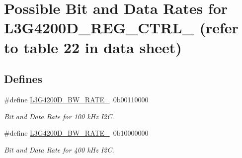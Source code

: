 \hypertarget{group___l3_g4200_d___b_w___r_a_t_e}{\section{\-Possible \-Bit and \-Data \-Rates for \-L3\-G4200\-D\-\_\-\-R\-E\-G\-\_\-\-C\-T\-R\-L\-\_ (refer to table 22 in data sheet)}
\label{group___l3_g4200_d___b_w___r_a_t_e}
}
\subsection*{\-Defines}
\begin{DoxyCompactItemize}
\item 
\hypertarget{group___l3_g4200_d___b_w___r_a_t_e_gaff099c109582a2b37649cf0f005c2f23}{\#define \hyperlink{group___l3_g4200_d___b_w___r_a_t_e_gaff099c109582a2b37649cf0f005c2f23}{\-L3\-G4200\-D\-\_\-\-B\-W\-\_\-\-R\-A\-T\-E\-\_}~0b00110000}\label{group___l3_g4200_d___b_w___r_a_t_e_gaff099c109582a2b37649cf0f005c2f23}

\begin{DoxyCompactList}\small\item\em \-Bit and \-Data \-Rate for 100 k\-Hz \-I2\-C. \end{DoxyCompactList}\item 
\hypertarget{group___l3_g4200_d___b_w___r_a_t_e_ga5a4ce71b8a706461d3fbd06e2fc1fe7d}{\#define \hyperlink{group___l3_g4200_d___b_w___r_a_t_e_ga5a4ce71b8a706461d3fbd06e2fc1fe7d}{\-L3\-G4200\-D\-\_\-\-B\-W\-\_\-\-R\-A\-T\-E\-\_}~0b10000000}\label{group___l3_g4200_d___b_w___r_a_t_e_ga5a4ce71b8a706461d3fbd06e2fc1fe7d}

\begin{DoxyCompactList}\small\item\em \-Bit and \-Data \-Rate for 400 k\-Hz \-I2\-C. \end{DoxyCompactList}\end{DoxyCompactItemize}
